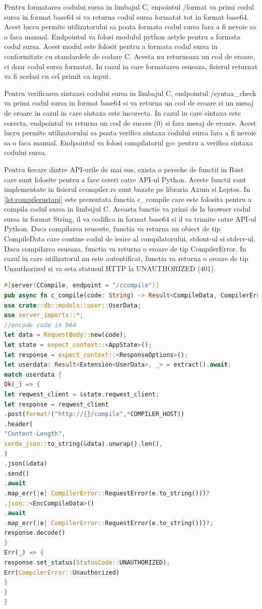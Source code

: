 \documentclass[titlepage,12pt]{article}
\DeclareRobustCommand{\code}[1]{{\ttfamily\small #1}}
\begin{document}
Pentru formatarea codului sursa in limbajul C, enpointul \code{/format} va primi codul sursa in format \code{base64} si va returna codul sursa formatat tot in format \code{base64}. Acest lucru permite utilizatorului sa poata formata codul sursa fara a fi nevoie sa o faca manual. Endpointul va folosi modulul python \code{astyle} pentru a formata codul sursa. Acest modul este folosit pentru a formata codul sursa in conformitate cu standardele de codare C. Acesta nu returneaza un cod de eroare, ci doar codul sursa formatat. In cazul in care formatarea esueaza, fisierul returnat va fi acelasi cu cel primit ca input.

Pentru verificarea sintaxei codului sursa in limbajul C, endpointul \code{/syntax\_check} va primi codul sursa in format \code{base64} si va returna un cod de eroare si un mesaj de eroare in cazul in care sintaxa este incorecta. In cazul in care sintaxa este corecta, endpointul va returna un cod de succes (0) si fara mesaj de eroare. Acest lucru permite utilizatorului sa poata verifica sintaxa codului sursa fara a fi nevoie sa o faca manual. Endpointul va folosi compilatorul \code{gcc} pentru a verifica sintaxa codului sursa.

Pentru fiecare dintre API-urile de mai sus, exista o pereche de functii in Rust care sunt folosite pentru a face cereri catre API-ul Python. Aceste functii sunt implementate in fisierul \code{ccompiler.rs} sunt bazate pe libraria \code{Axum} si \code{Leptos}. In \cref{lst:compilerustapi} este prezentata functia \code{c\_compile} care este folosita pentru a compila codul sursa in limbajul C. Aceasta functie va primi de la browser codul sursa in format \code{String}, il va codifica in format \code{base64} si il va trimite catre API-ul Python. Daca compilarea reuseste, functia va returna un obiect de tip \code{CompileData} care contine codul de iesire al compilatorului, stdout-ul si stderr-ul. Daca compilarea esueaza, functia va returna o eroare de tip \code{CompilerError}. In cazul in care utilizatorul nu este autentificat, functia va returna o eroare de tip \code{Unauthorized} si va seta statusul HTTP la \code{UNAUTHORIZED (401)}.

\begin{lstlisting}[language=Rust,caption={API Rust pentru compilarea codului C},label={lst:compilerustapi}]
#[server(CCompile, endpoint = "/ccompile")]
pub async fn c_compile(code: String) -> Result<CompileData, CompilerError> {
use crate::db::models::user::UserData;
use server_imports::*;
//encode code in b64
let data = RequestBody::new(code);
let state = expect_context::<AppState>();
let response = expect_context::<ResponseOptions>();
let userdata: Result<Extension<UserData>, _> = extract().await;
match userdata {
Ok(_) => {
let reqwest_client = &state.reqwest_client;
let response = reqwest_client
.post(format!("http://{}/compile",*COMPILER_HOST))
.header(
"Content-Length",
serde_json::to_string(&data).unwrap().len(),
)
.json(&data)
.send()
.await
.map_err(|e| CompilerError::RequestError(e.to_string()))?
.json::<EncCompileData>()
.await
.map_err(|e| CompilerError::RequestError(e.to_string()))?;
response.decode()
}
Err(_) => {
response.set_status(StatusCode::UNAUTHORIZED);
Err(CompilerError::Unauthorized)
}
}
}
\end{lstlisting}
\end{document}
